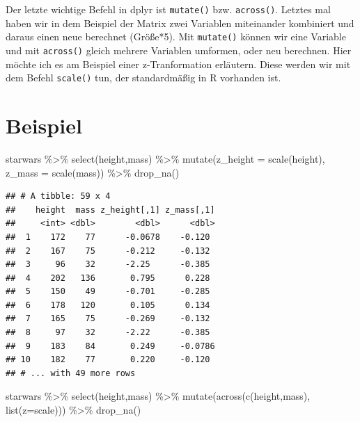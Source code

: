 \documentclass[
]{book}
\newenvironment{Shaded}{\begin{snugshade}}{\end{snugshade}}
\newcommand{\AttributeTok}[1]{\textcolor[rgb]{0.77,0.63,0.00}{#1}}
\newcommand{\FunctionTok}[1]{\textcolor[rgb]{0.00,0.00,0.00}{#1}}
\newcommand{\NormalTok}[1]{#1}
\newcommand{\SpecialCharTok}[1]{\textcolor[rgb]{0.00,0.00,0.00}{#1}}
\theoremstyle{definition}
\theoremstyle{definition}
\theoremstyle{definition}
\theoremstyle{definition}
\theoremstyle{remark}
\begin{document}
Der letzte wichtige Befehl in dplyr ist \texttt{mutate()} bzw. \texttt{across()}. Letztes mal haben wir in dem Beispiel der Matrix zwei Variablen miteinander kombiniert und daraus einen neue berechnet (Größe*5). Mit \texttt{mutate()} können wir eine Variable und mit \texttt{across()} gleich mehrere Variablen umformen, oder neu berechnen. Hier möchte ich es am Beispiel einer z-Tranformation erläutern. Diese werden wir mit dem Befehl \texttt{scale()} tun, der standardmäßig in R vorhanden ist.

\hypertarget{beispiel-1}{%
\section{Beispiel}\label{beispiel-1}}

\begin{Shaded}
\begin{Highlighting}[]
\NormalTok{starwars }\SpecialCharTok{\%\textgreater{}\%} 
  \FunctionTok{select}\NormalTok{(height,mass) }\SpecialCharTok{\%\textgreater{}\%} 
  \FunctionTok{mutate}\NormalTok{(}\AttributeTok{z\_height =} \FunctionTok{scale}\NormalTok{(height),}
         \AttributeTok{z\_mass =} \FunctionTok{scale}\NormalTok{(mass)) }\SpecialCharTok{\%\textgreater{}\%} 
  \FunctionTok{drop\_na}\NormalTok{()}
\end{Highlighting}
\end{Shaded}

\begin{verbatim}
## # A tibble: 59 x 4
##    height  mass z_height[,1] z_mass[,1]
##     <int> <dbl>        <dbl>      <dbl>
##  1    172    77      -0.0678    -0.120 
##  2    167    75      -0.212     -0.132 
##  3     96    32      -2.25      -0.385 
##  4    202   136       0.795      0.228 
##  5    150    49      -0.701     -0.285 
##  6    178   120       0.105      0.134 
##  7    165    75      -0.269     -0.132 
##  8     97    32      -2.22      -0.385 
##  9    183    84       0.249     -0.0786
## 10    182    77       0.220     -0.120 
## # ... with 49 more rows
\end{verbatim}

\begin{Shaded}
\begin{Highlighting}[]
\NormalTok{ starwars }\SpecialCharTok{\%\textgreater{}\%} \FunctionTok{select}\NormalTok{(height,mass) }\SpecialCharTok{\%\textgreater{}\%} 
  \FunctionTok{mutate}\NormalTok{(}\FunctionTok{across}\NormalTok{(}\FunctionTok{c}\NormalTok{(height,mass), }\FunctionTok{list}\NormalTok{(}\AttributeTok{z=}\NormalTok{scale))) }\SpecialCharTok{\%\textgreater{}\%}
  \FunctionTok{drop\_na}\NormalTok{()}
\end{Highlighting}
\end{Shaded}
\end{document}

